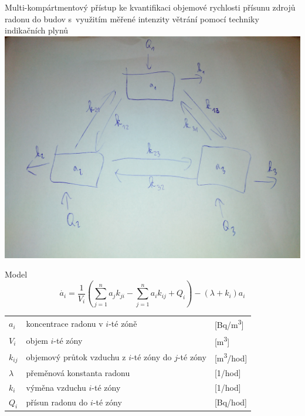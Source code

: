 \documentclass[10pt]{beamer}
\begin{document}
\begin{frame}{Multi-kompártmentový přístup ke kvantifikaci  objemové rychlosti přísunu zdrojů radonu do budov s využitím měřené intenzity větrání pomocí techniky indikačních plynů}
    \small
    \centering
        \includegraphics[width=.8\textwidth]{model.jpg}
\end{frame}

\begin{frame}{Model}
    \small
    \begin{equation}
        \dot{a_i}=\frac{1}{V_i}\left( \sum^n_{j=1}a_j k_{ji}-\sum^n_{j=1}a_i k_{ij}+Q_i \right)-(\lambda+k_i)a_i
        \label{eq:odvozovani}
    \end{equation}
    \begin{table}
        \centering
        \begin{tabular}{lll}
            $a_i$ & koncentrace radonu v $i$-té zóně& [\si{Bq/m^3}] \\
            $V_i$ & objem $i$-té zóny& [\si{m^3}] \\
            $k_{ij}$ & objemový průtok vzduchu z $i$-té zóny do $j$-té zóny& [\si{m^3/hod}]\\
            $\lambda$ & přeměnová konstanta radonu& [\si{1/hod}]\\
            $k_i$ & výměna vzduchu $i$-té zóny& [\si{1/hod}] \\
            $Q_i$ & přísun radonu do $i$-té zóny& [\si{Bq/hod}] \\
        \end{tabular}
    \end{table}
\end{frame}
\end{document}
